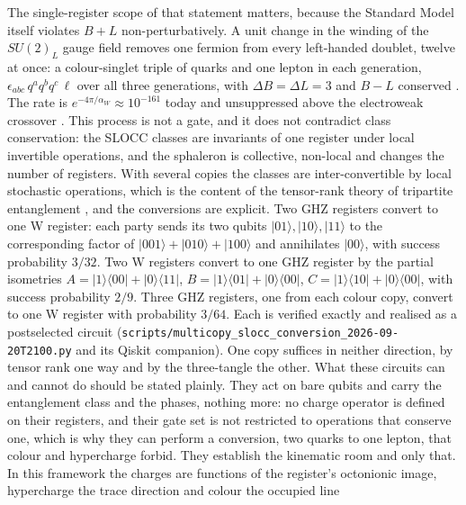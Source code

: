 The single-register scope of that statement matters, because the Standard Model itself violates
$B+L$ non-perturbatively. A unit change in the winding of the $SU(2)_{L}$ gauge field removes one
fermion from every left-handed doublet, twelve at once: a colour-singlet triple of quarks and one
lepton in each generation, $\epsilon_{abc}\,q^{a}q^{b}q^{c}\,\ell$ over all three generations, with
$\Delta B = \Delta L = 3$ and $B-L$ conserved \autocite{thooft1976symmetry}. The rate is
$e^{-4\pi/\alpha_{W}} \approx 10^{-161}$ today and unsuppressed above the electroweak crossover
\autocite{kuzminrubakovshaposhnikov1985anomalous}. This process is not a gate, and it does not
contradict class conservation: the SLOCC classes are invariants of one register under local
invertible operations, and the sphaleron is collective, non-local and changes the number of
registers. With several copies the classes are inter-convertible by local stochastic operations,
which is the content of the tensor-rank theory of tripartite entanglement
\autocite{chitambarduanshi2008tripartite}, and the conversions are explicit. Two GHZ registers
convert to one W register: each party sends its two qubits $\lvert01\rangle, \lvert10\rangle,
\lvert11\rangle$ to the corresponding factor of $\lvert001\rangle + \lvert010\rangle +
\lvert100\rangle$ and annihilates $\lvert00\rangle$, with success probability $3/32$. Two W
registers convert to one GHZ register by the partial isometries $A = \lvert1\rangle\langle00\rvert +
\lvert0\rangle\langle11\rvert$, $B = \lvert1\rangle\langle01\rvert + \lvert0\rangle\langle00\rvert$,
$C = \lvert1\rangle\langle10\rvert + \lvert0\rangle\langle00\rvert$, with success probability
$2/9$. Three GHZ registers, one from each colour copy, convert to one W register with probability
$3/64$. Each is verified exactly and realised as a postselected circuit
(\texttt{scripts/multicopy\_slocc\_conversion\_2026-09-20T2100.py} and its Qiskit companion). One
copy suffices in neither direction, by tensor rank one way and by the three-tangle the other. What
these circuits can and cannot do should be stated plainly. They act on bare qubits and carry the
entanglement class and the phases, nothing more: no charge operator is defined on their registers,
and their gate set is not restricted to operations that conserve one, which is why they can perform
a conversion, two quarks to one lepton, that colour and hypercharge forbid. They establish the
kinematic room and only that. In this framework the charges are functions of the register's
octonionic image, hypercharge the trace direction and colour the occupied line
